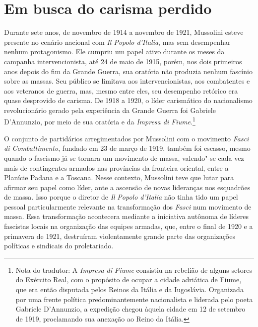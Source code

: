 \section{Em busca do carisma perdido}

Durante sete anos, de novembro de 1914 a novembro de 1921, Mussolini
esteve presente no cenário nacional com \emph{Il Popolo d'Italia}, mas
sem desempenhar nenhum protagonismo. Ele cumpriu um papel ativo durante
os meses da campanha intervencionista, até 24 de maio de 1915, porém,
nos dois primeiros anos depois do fim da Grande Guerra, sua oratória não
produzia nenhum fascínio sobre as massas. Seu público se limitava aos
intervencionistas, aos combatentes e aos veteranos de guerra, mas, mesmo
entre eles, seu desempenho retórico era quase desprovido de carisma. De
1918 a 1920, o líder carismático do nacionalismo revolucionário gerado
pela experiência da Grande Guerra foi Gabriele D'Annunzio, por meio de
sua oratória e da \emph{Impresa di Fiume}.\footnote{Nota do tradutor: A
  \emph{Impresa di Fiume} consistiu na rebelião de alguns setores do
  Exército Real, com o propósito de ocupar a cidade adriática de Fiume,
  que era então disputada pelos Reinos da Itália e da Iugoslávia.
  Organizada por uma frente política predominantemente nacionalista e
  liderada pelo poeta Gabriele D'Annunzio, a expedição chegou àquela
  cidade em 12 de setembro de 1919, proclamando sua anexação ao Reino da
  Itália.}

O conjunto de partidários arregimentados por Mussolini com o movimento
\emph{Fasci di Combattimento}, fundado em 23 de março de 1919, também
foi escasso, mesmo quando o fascismo já se tornara um movimento de
massa, valendo"-se cada vez mais de contingentes armados nas províncias
da fronteira oriental, entre a Planície Padana e a Toscana. Nesse
contexto, Mussolini teve que lutar para afirmar seu papel como líder,
ante a ascensão de novas lideranças nos esquadrões de massa. Isso porque
o diretor de \emph{Il} \emph{Popolo d'Italia} não tinha tido um papel
pessoal particularmente relevante na transformação dos \emph{Fasci} num
movimento de massa. Essa transformação acontecera mediante a iniciativa
autônoma de líderes fascistas locais na organização das equipes armadas,
que, entre o final de 1920 e a primavera de 1921, destruíram
violentamente grande parte das organizações políticas e sindicais do
proletariado.

